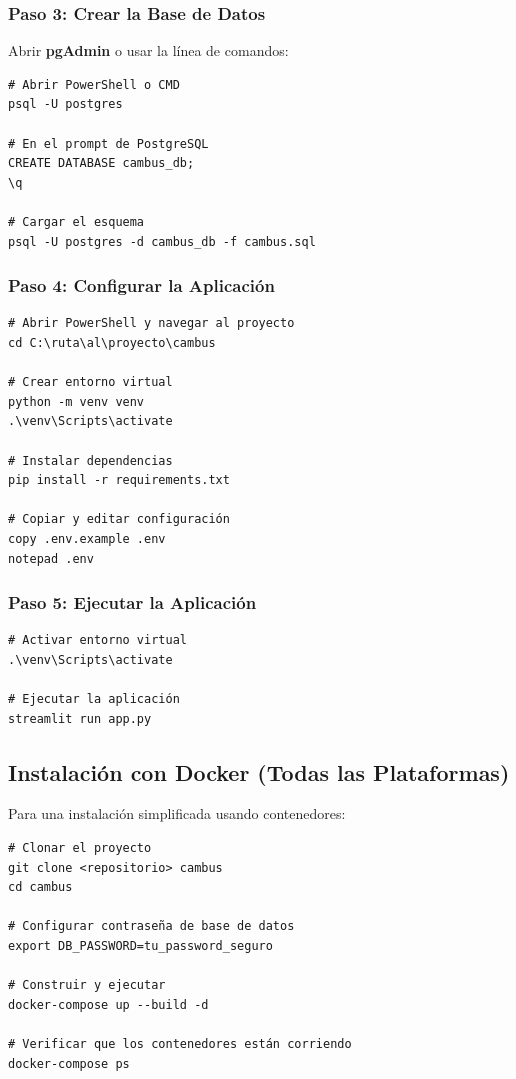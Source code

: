 \documentclass[12pt,a4paper]{article}
\begin{document}
\subsubsection{Paso 3: Crear la Base de Datos}

Abrir \textbf{pgAdmin} o usar la línea de comandos:

\begin{lstlisting}[style=bash]
# Abrir PowerShell o CMD
psql -U postgres

# En el prompt de PostgreSQL
CREATE DATABASE cambus_db;
\q

# Cargar el esquema
psql -U postgres -d cambus_db -f cambus.sql
\end{lstlisting}

\subsubsection{Paso 4: Configurar la Aplicación}

\begin{lstlisting}[style=bash]
# Abrir PowerShell y navegar al proyecto
cd C:\ruta\al\proyecto\cambus

# Crear entorno virtual
python -m venv venv
.\venv\Scripts\activate

# Instalar dependencias
pip install -r requirements.txt

# Copiar y editar configuración
copy .env.example .env
notepad .env
\end{lstlisting}

\subsubsection{Paso 5: Ejecutar la Aplicación}

\begin{lstlisting}[style=bash]
# Activar entorno virtual
.\venv\Scripts\activate

# Ejecutar la aplicación
streamlit run app.py
\end{lstlisting}

\subsection{Instalación con Docker (Todas las Plataformas)}

Para una instalación simplificada usando contenedores:

\begin{lstlisting}[style=bash]
# Clonar el proyecto
git clone <repositorio> cambus
cd cambus

# Configurar contraseña de base de datos
export DB_PASSWORD=tu_password_seguro

# Construir y ejecutar
docker-compose up --build -d

# Verificar que los contenedores están corriendo
docker-compose ps
\end{lstlisting}
\end{document}
